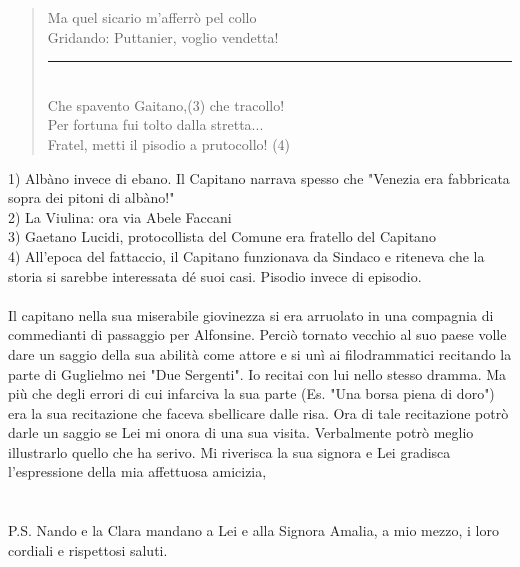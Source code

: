{\begin{verse}
	Ma quel sicario m'afferrò pel collo\\
	Gridando: Puttanier, voglio vendetta!\\
	\rule{1.5cm}{0.4pt}\\
	Che spavento Gaitano,(3) che tracollo!\\
	Per fortuna fui tolto dalla stretta...\\
	Fratel, metti il pisodio a prutocollo! (4)\\
\end{verse}
1) Albàno invece di ebano. Il Capitano narrava spesso che "Venezia era fabbricata sopra dei pitoni di albàno!"\\
2) La Viulina: ora via Abele Faccani\\
3) Gaetano Lucidi, protocollista del Comune era fratello del Capitano\\
4) All'epoca del fattaccio, il Capitano funzionava da Sindaco e riteneva che la storia si sarebbe interessata dé suoi casi. Pisodio invece di episodio. \\
\\
Il capitano nella sua miserabile giovinezza si era arruolato in una compagnia di commedianti di passaggio per Alfonsine. Perciò tornato vecchio al suo paese volle dare un saggio della sua abilità come attore e si unì ai filodrammatici recitando la parte di Guglielmo nei "Due Sergenti". Io recitai con lui nello stesso dramma. Ma più che degli errori di cui infarciva la sua parte (Es. "Una borsa piena di doro") era la sua recitazione che faceva sbellicare dalle risa. Ora di tale recitazione potrò darle un saggio se Lei mi onora di una sua visita. Verbalmente potrò meglio illustrarlo quello che ha serivo. Mi riverisca la sua signora e Lei gradisca l'espressione della mia affettuosa amicizia,\\
\\\\P.S. Nando e la Clara mandano a Lei e alla Signora Amalia, a mio mezzo, i loro cordiali e rispettosi saluti.
}\\

